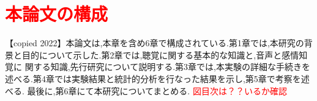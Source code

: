 

\section{\textcolor{red}{本論文の構成}}
\label{sec:本論文の構成}
【copied 2022】本論文は,本章を含め6章で構成されている.第1章では,本研究の背景と目的について示した.第2章では,聴覚に関する基本的な知識と,音声と感情知覚に
関する知識,先行研究について説明する.第3章では,本実験の詳細な手続きを述べる.第4章では実験結果と統計的分析を行なった結果を示し,第5章で考察を述べる.
最後に,第6章にて本研究についてまとめる.
\textcolor{red}{図目次は？？いるか確認}

